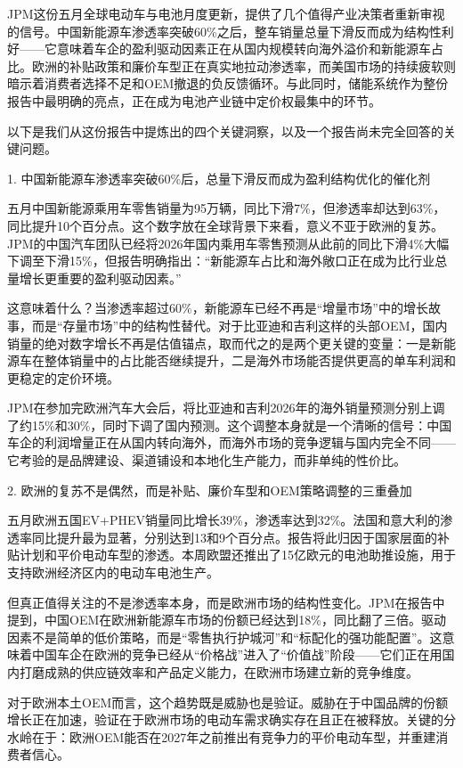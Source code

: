 \documentclass[11pt]{ctexart}
\begin{document}
JPM这份五月全球电动车与电池月度更新，提供了几个值得产业决策者重新审视的信号。中国新能源车渗透率突破60\%之后，整车销量总量下滑反而成为结构性利好——它意味着车企的盈利驱动因素正在从国内规模转向海外溢价和新能源车占比。欧洲的补贴政策和廉价车型正在真实地拉动渗透率，而美国市场的持续疲软则暗示着消费者选择不足和OEM撤退的负反馈循环。与此同时，储能系统作为整份报告中最明确的亮点，正在成为电池产业链中定价权最集中的环节。

以下是我们从这份报告中提炼出的四个关键洞察，以及一个报告尚未完全回答的关键问题。

1. 中国新能源车渗透率突破60\%后，总量下滑反而成为盈利结构优化的催化剂

五月中国新能源乘用车零售销量为95万辆，同比下滑7\%，但渗透率却达到63\%，同比提升10个百分点。这个数字放在全球背景下来看，意义不亚于欧洲的复苏。JPM的中国汽车团队已经将2026年国内乘用车零售预测从此前的同比下滑4\%大幅下调至下滑15\%，但报告明确指出：“新能源车占比和海外敞口正在成为比行业总量增长更重要的盈利驱动因素。”

这意味着什么？当渗透率超过60\%，新能源车已经不再是“增量市场”中的增长故事，而是“存量市场”中的结构性替代。对于比亚迪和吉利这样的头部OEM，国内销量的绝对数字增长不再是估值锚点，取而代之的是两个更关键的变量：一是新能源车在整体销量中的占比能否继续提升，二是海外市场能否提供更高的单车利润和更稳定的定价环境。

JPM在参加完欧洲汽车大会后，将比亚迪和吉利2026年的海外销量预测分别上调了约15\%和30\%，同时下调了国内预测。这个调整本身就是一个清晰的信号：中国车企的利润增量正在从国内转向海外，而海外市场的竞争逻辑与国内完全不同——它考验的是品牌建设、渠道铺设和本地化生产能力，而非单纯的性价比。

2. 欧洲的复苏不是偶然，而是补贴、廉价车型和OEM策略调整的三重叠加

五月欧洲五国EV+PHEV销量同比增长39\%，渗透率达到32\%。法国和意大利的渗透率同比提升最为显著，分别达到13和9个百分点。报告将此归因于国家层面的补贴计划和平价电动车型的渗透。本周欧盟还推出了15亿欧元的电池助推设施，用于支持欧洲经济区内的电动车电池生产。

但真正值得关注的不是渗透率本身，而是欧洲市场的结构性变化。JPM在报告中提到，中国OEM在欧洲新能源车市场的份额已经达到18\%，同比翻了三倍。驱动因素不是简单的低价策略，而是“零售执行护城河”和“标配化的强功能配置”。这意味着中国车企在欧洲的竞争已经从“价格战”进入了“价值战”阶段——它们正在用国内打磨成熟的供应链效率和产品定义能力，在欧洲市场建立新的竞争维度。

对于欧洲本土OEM而言，这个趋势既是威胁也是验证。威胁在于中国品牌的份额增长正在加速，验证在于欧洲市场的电动车需求确实存在且正在被释放。关键的分水岭在于：欧洲OEM能否在2027年之前推出有竞争力的平价电动车型，并重建消费者信心。
\end{document}
